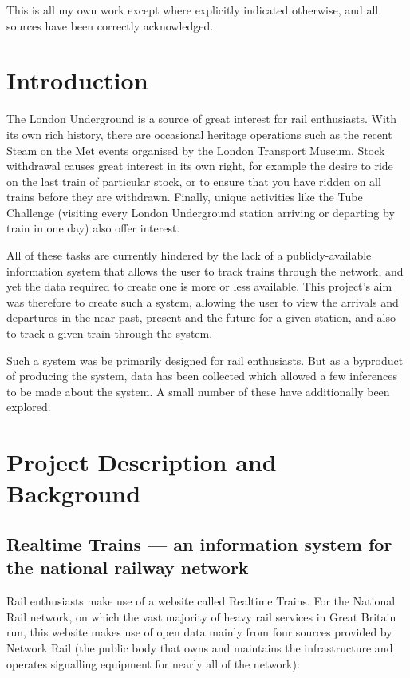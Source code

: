 \documentclass[a4paper,12pt]{article}
\begin{document}
This is all my own work except where explicitly indicated otherwise, and all
sources have been correctly acknowledged.

\pagebreak

\section{Introduction}

The London Underground is a source of great interest for rail enthusiasts. With
its own rich history, there are occasional heritage operations such as the
recent Steam on the Met events organised by the London Transport Museum. Stock
withdrawal causes great interest in its own right, for example the desire to
ride on the last train of particular stock, or to ensure that you have ridden
on all trains before they are withdrawn. Finally, unique activities like the
Tube Challenge (visiting every London Underground station arriving or departing
by train in one day) also offer interest.

All of these tasks are currently hindered by the lack of a publicly-available
information system that allows the user to track trains through the network,
and yet the data required to create one is more or less available. This
project's aim was therefore to create such a system, allowing the user to view
the arrivals and departures in the near past, present and the future for a
given station, and also to track a given train through the system.

Such a system was be primarily designed for rail enthusiasts. But as a
byproduct of producing the system, data has been collected which allowed a few
inferences to be made about the system. A small number of these have
additionally been explored.

\section{Project Description and Background}

\subsection{Realtime Trains --- an information system for the national railway
network}

Rail enthusiasts make use of a website called Realtime Trains. For the National
Rail network, on which the vast majority of heavy rail services in Great
Britain run, this website makes use of open data mainly from four sources
provided by Network Rail (the public body that owns and maintains the
infrastructure and operates signalling equipment for nearly all of the
network)\cite{RTTData}:
\end{document}

